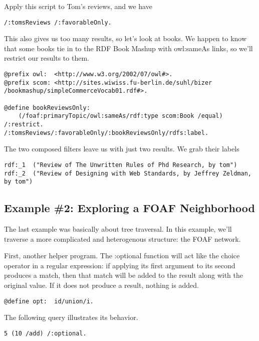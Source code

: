 \documentclass[runningheads]{llncs}
\begin{document}
Apply this script to Tom's reviews, and we have

\begin{verbatim}
/:tomsReviews /:favorableOnly.
\end{verbatim}

This also gives us too many results, so let's look at books.  We happen to know that some books tie in to the RDF Book Mashup with owl:sameAs links, so we'll restrict our results to them.

\begin{verbatim}
@prefix owl:  <http://www.w3.org/2002/07/owl#>.
@prefix scom: <http://sites.wiwiss.fu-berlin.de/suhl/bizer
/bookmashup/simpleCommerceVocab01.rdf#>.

@define bookReviewsOnly:
    (/foaf:primaryTopic/owl:sameAs/rdf:type scom:Book /equal) /:restrict.
/:tomsReviews/:favorableOnly/:bookReviewsOnly/rdfs:label.
\end{verbatim}

The two composed filters leave us with just two results.  We grab their labels

\begin{verbatim}
rdf:_1  ("Review of The Unwritten Rules of Phd Research, by tom")
rdf:_2  ("Review of Designing with Web Standards, by Jeffrey Zeldman, by tom")
\end{verbatim}


\subsection{Example \#2: Exploring a FOAF Neighborhood}

The last example was basically about tree traversal.  In this example, we'll traverse a more complicated and heterogenous structure: the FOAF network.

First, another helper program.  The :optional function will act like the choice operator in a regular expression: if applying its first argument to its second produces a match, then that match will be added to the result along with the original value.  If it does not produce a result, nothing is added.

\begin{verbatim}
@define opt:  id/union/i.
\end{verbatim}

The following query illustrates its behavior.

\begin{verbatim}
5 (10 /add) /:optional.
\end{verbatim}
\end{document}

